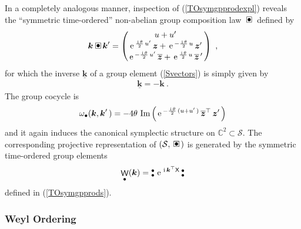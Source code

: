 \documentclass[11pt,a4paper]{article}
\DeclareMathOperator{\weyl}{{\sf W}}                   %
\newcommand{\compb}{\mkern+4mu\square\mkern-17.4mu{\mbox{
    \protect\raisebox{0.2ex}{$\bullet$}}\mkern+5mu}}    %
\newcommand{\NOb}{\mbox{$\substack{\bullet\\\bullet}$}} %
\newcommand{\ii}{{\rm i}}
\newcommand{\mbf}[1]{{\boldsymbol {#1} }}
\def\ii{{\,{\rm i}\,}}
\def\X{{\sf X}}
\def\mz{{\mbf z}}
\def\mk{{\mbf k}}
\def\mcS{{\mathcal S}}
\newcommand{\complex}{{\mathbb C}} %
\def\e{{\,\rm e}\,}
\newcommand{\beq}{\begin{eqnarray}}
\newcommand{\eeq}{\end{eqnarray}}
\begin{document}
In a completely analogous manner, inspection of
(\ref{TOsymgpprodexpl}) reveals the ``symmetric time-ordered''
non-abelian group composition law $\compb$ defined by
\beq
\mk\compb\mk'=\begin{pmatrix}u+u'\,\\\e^{\frac{\ii\theta}2\,u'}\,\mz+
\e^{-\frac{\ii\theta}2\,u}\,\mz'\,\\\e^{-\frac{\ii\theta}2\,u'}\,
\overline{\mz}+
\e^{\frac{\ii\theta}2\,u}\,\overline{\mz}^{\,\prime}\,\end{pmatrix} \ ,
\label{TOsymcomplaw}\eeq
for which the inverse $\underline{\mk}$ of a group element
(\ref{Svectors}) is simply given by
\beq
\underline{\mk}=-\mk \ .
\label{TOsyminverse}\eeq
The group cocycle is
\beq
\omega_\bullet(\mk,\mk'\,)=-4\theta~{\rm Im}\left(\e^{-\frac{\ii\theta}2\,
(u+u'\,)}\,\overline{\mz}^\top\,\mz'\,\right)
\label{TOsymcocycle}\eeq
and it again induces the canonical symplectic structure on
$\complex^2\subset\mcS$. The corresponding projective representation
of $(\mcS,\compb)$ is generated by the symmetric time-ordered group
elements
\beq
\weyl_\bullet(\mk)=\NOb\,\e^{\ii\mk^\top\X}\,\NOb
\label{TOsymweylop}\eeq
defined in (\ref{TOsymgpprods}).

\subsubsection{Weyl Ordering\label{WOPGWS}}
\end{document}
